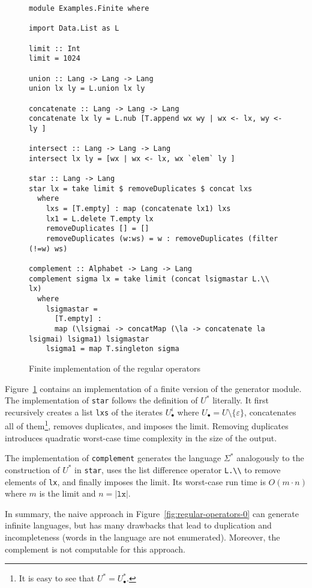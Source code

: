 \begin{figure}[tp]
\begin{verbatim}
module Examples.Finite where

import Data.List as L

limit :: Int
limit = 1024

union :: Lang -> Lang -> Lang
union lx ly = L.union lx ly

concatenate :: Lang -> Lang -> Lang
concatenate lx ly = L.nub [T.append wx wy | wx <- lx, wy <- ly ]

intersect :: Lang -> Lang -> Lang
intersect lx ly = [wx | wx <- lx, wx `elem` ly ]

star :: Lang -> Lang
star lx = take limit $ removeDuplicates $ concat lxs
  where
    lxs = [T.empty] : map (concatenate lx1) lxs
    lx1 = L.delete T.empty lx
    removeDuplicates [] = []
    removeDuplicates (w:ws) = w : removeDuplicates (filter (!=w) ws)

complement :: Alphabet -> Lang -> Lang
complement sigma lx = take limit (concat lsigmastar L.\\ lx) 
  where
    lsigmastar =
      [T.empty] : 
      map (\lsigmai -> concatMap (\la -> concatenate la lsigmai) lsigma1) lsigmastar
    lsigma1 = map T.singleton sigma
\end{verbatim}
  \caption{Finite implementation of the regular operators}
  \label{fig:finite-regular-operators}
\end{figure}
Figure~\ref{fig:finite-regular-operators} contains an implementation
of a finite version of the generator module. The implementation of
\texttt{star} follows the definition of $U^*$ literally. It first
recursively creates a list \texttt{lxs} of the iterates $U_\bullet^i$ where
$U_\bullet = U \setminus \{\varepsilon\}$, concatenates all of
them\footnote{It is easy to see that $U^* = U_\bullet^*$.}, removes
duplicates, and imposes the limit. Removing duplicates introduces quadratic
worst-case time complexity in the size of the output.

The implementation of \texttt{complement} generates the language
$\Sigma^*$ analogously to the construction of $U^*$ in
\texttt{star}, uses the list difference operator
\texttt{L.\textbackslash\textbackslash} to remove elements of
\texttt{lx}, and finally imposes the limit. Its worst-case run time is
$O(m\cdot n)$ where $m$ is the limit and $n = |\texttt{lx}|$.

In summary, the naive approach in
Figure~\ref{fig:regular-operators-0} can generate infinite languages,
but has many drawbacks that lead to duplication and incompleteness
(words in the language are not enumerated). Moreover, the complement
is not computable for this approach.

